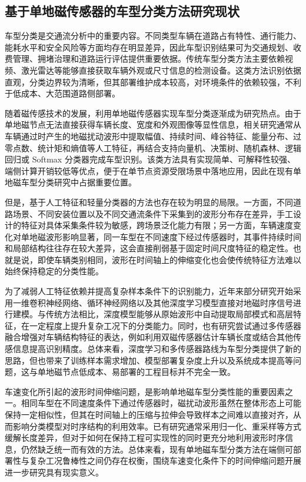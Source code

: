 \subsection{基于单地磁传感器的车型分类方法研究现状}
\label{sec:related_vehicle_classification}

车型分类是交通流分析中的重要内容。不同类型车辆在道路占有特性、通行能力、能耗水平和安全风险等方面均存在明显差异，因此车型识别结果可为交通规划、收费管理、拥堵治理和道路运行评估提供重要依据。传统车型分类方法主要依赖视频、激光雷达等能够直接获取车辆外观或尺寸信息的检测设备。这类方法识别依据直观，分类边界较为清晰，但其部署维护成本较高，对环境条件的依赖较强，不利于低成本、大范围道路侧部署。

随着磁传感技术的发展，利用单地磁传感器实现车型分类逐渐成为研究热点。由于单地磁节点无法直接获得车辆长度、宽度和外观图像等显性信息，相关研究通常从车辆通过时产生的地磁扰动波形中提取幅值、持续时间、峰谷特征、能量分布、过零点数、统计矩和熵值等人工特征，再结合支持向量机、决策树、随机森林、逻辑回归或 Softmax 分类器完成车型识别。该类方法具有实现简单、可解释性较强、端侧计算开销较低等优点，便于在单节点资源受限场景中落地应用，因此在现有单地磁车型分类研究中占据重要位置。

但是，基于人工特征和轻量分类器的方法也存在较为明显的局限。一方面，不同道路场景、不同安装位置以及不同交通流条件下采集到的波形分布存在差异，手工设计的特征对具体采集条件较为敏感，跨场景泛化能力有限；另一方面，车辆速度变化对单地磁波形影响显著，同一车型在不同速度下经过传感器时，其事件持续时间和局部结构往往存在较大差异，这会直接削弱基于固定时间尺度特征的稳定性。也就是说，即使车辆类别相同，波形在时间轴上的伸缩变化也会使传统特征方法难以始终保持稳定的分类性能。

为了减弱人工特征依赖并提高复杂样本条件下的识别能力，近年来部分研究开始采用一维卷积神经网络、循环神经网络以及其他深度学习模型直接对地磁时序信号进行建模。与传统方法相比，深度模型能够从原始波形中自动提取局部模式和高层特征，在一定程度上提升复杂工况下的分类能力。同时，也有研究尝试通过多传感器融合增强对车辆结构特征的表达，例如利用双磁传感器估计车辆长度或结合其他传感信息提高识别精度。总体来看，深度学习和多传感器路线为车型分类提供了新的思路，但也带来了训练样本需求增加、模型部署复杂度上升以及系统成本提高等问题，这与单地磁节点低成本、易部署的工程目标并不完全一致。

车速变化所引起的波形时间伸缩问题，是影响单地磁车型分类性能的重要因素之一。相同车型在不同速度条件下通过传感器时，磁扰动波形虽然在整体形态上可能保持一定相似性，但其在时间轴上的压缩与拉伸会导致样本之间难以直接对齐，从而影响分类模型对时序结构的利用效率。已有研究通常采用归一化、重采样等方式缓解长度差异，但对于如何在保持工程可实现性的同时更充分地利用波形时序信息，仍然缺乏统一而有效的方法。总体来看，现有单地磁车型分类方法在端侧可部署性与复杂工况鲁棒性之间仍存在权衡，围绕车速变化条件下的时间伸缩问题开展进一步研究具有现实意义。

